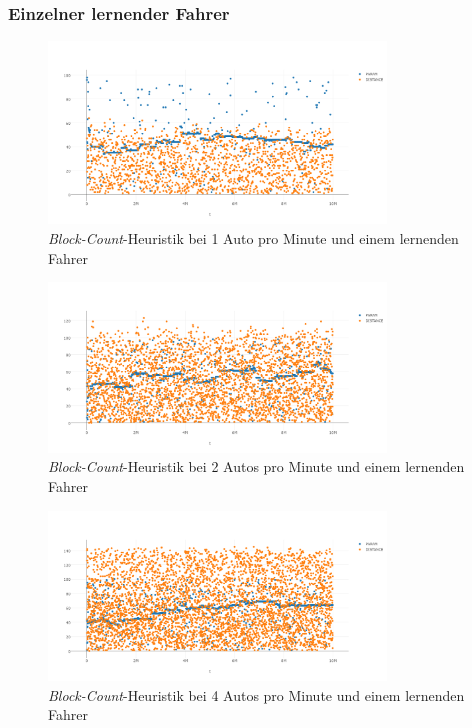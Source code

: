 \subsubsection*{Einzelner lernender Fahrer}
\begin{figure}[H]
	\includegraphics[width=0.8\textwidth]{analyse/SingleMutant/blockcount1.png}
	\caption{\emph{Block-Count}-Heuristik bei 1 Auto pro Minute und einem lernenden Fahrer}\label{fig:ap_sm_bc_1}
\end{figure}
\begin{figure}[H]
	\includegraphics[width=0.8\textwidth]{analyse/SingleMutant/blockcount2.png}
	\caption{\emph{Block-Count}-Heuristik bei 2 Autos pro Minute und einem lernenden Fahrer}\label{fig:ap_sm_bc_2}
\end{figure}
\begin{figure}[H]
	\includegraphics[width=0.8\textwidth]{analyse/SingleMutant/blockcount4.png}
	\caption{\emph{Block-Count}-Heuristik bei 4 Autos pro Minute und einem lernenden Fahrer}\label{fig:ap_sm_bc_4}
\end{figure}
